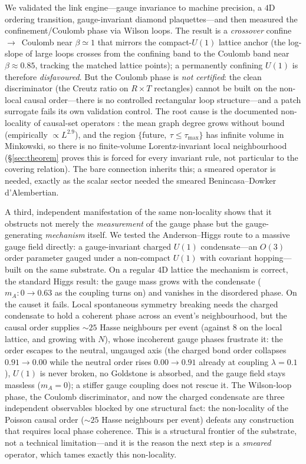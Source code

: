 \documentclass[aps,prd,reprint,nofootinbib,superscriptaddress,floatfix]{revtex4-2}
\begin{document}
We validated the link engine---gauge invariance to machine precision, a $4$D ordering
transition, gauge-invariant diamond plaquettes---and then measured the
confinement/Coulomb phase via Wilson loops. The result is a \emph{crossover}
confine~$\to$~Coulomb near $\beta\simeq1$ that mirrors the compact-$U(1)$ lattice anchor
(the log-slope of large loops crosses from the confining band to the Coulomb band near
$\beta\approx0.85$, tracking the matched lattice points); a permanently confining $U(1)$
is therefore \emph{disfavoured}. But the Coulomb phase is \emph{not certified}: the clean
discriminator (the Creutz ratio on $R\times T$ rectangles) cannot be built on the
non-local causal order---there is no controlled rectangular loop structure---and a patch
surrogate fails its own validation control. The root cause is the documented non-locality
of causal-set operators \cite{Sorkin2007,BenincasaDowker2010}: the mean graph degree
grows without bound (empirically $\propto L^{2.9}$), and the region
$\{$future$,\ \tau\le\tau_{\max}\}$ has infinite volume in Minkowski, so there is no
finite-volume Lorentz-invariant local neighbourhood (\S\ref{sec:theorem} proves this is
forced for every invariant rule, not particular to the covering relation). The bare
connection inherits this;
a smeared operator is needed, exactly as the scalar sector needed the smeared
Benincasa--Dowker d'Alembertian.

A third, independent manifestation of the same non-locality shows that it obstructs not
merely the \emph{measurement} of the gauge phase but the gauge-generating
\emph{mechanism} itself. We tested the Anderson--Higgs route to a massive gauge field
directly: a gauge-invariant charged $U(1)$ condensate---an $O(3)$ order parameter gauged
under a non-compact $U(1)$ with covariant hopping---built on the same substrate. On a
regular $4$D lattice the mechanism is correct, the standard Higgs result: the gauge mass
grows with the condensate ($m_A:0\to0.63$ as the coupling turns on) and vanishes in the
disordered phase. On the causet it fails. Local spontaneous symmetry breaking needs the
charged condensate to hold a coherent phase across an event's neighbourhood, but the
causal order supplies $\sim25$ Hasse neighbours per event (against $8$ on the local
lattice, and growing with $N$), whose incoherent gauge phases frustrate it: the order
escapes to the neutral, ungauged axis (the charged bond order collapses $0.91\to0.00$
while the neutral order rises $0.00\to0.91$ already at coupling $\lambda=0.1$), $U(1)$ is
never broken, no Goldstone is absorbed, and the gauge field stays massless ($m_A=0$); a
stiffer gauge coupling does not rescue it. The Wilson-loop phase, the Coulomb
discriminator, and now the charged condensate are three independent observables blocked
by one structural fact: the non-locality of the Poisson causal order ($\sim25$ Hasse
neighbours per event) defeats any construction that requires local phase coherence. This
is a structural frontier of the substrate, not a technical limitation---and it is the
reason the next step is a \emph{smeared} operator, which tames exactly this non-locality.
\end{document}
